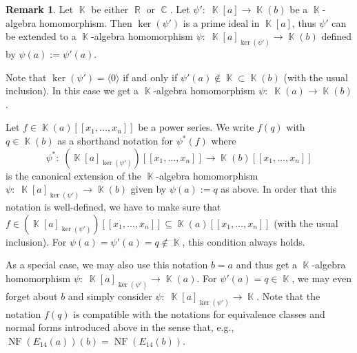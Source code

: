 \documentclass[noend]{amsproc}
\theoremstyle{definition}
\newtheorem{remark}[theorem]{Remark}
\newcommand{\NF}[1]{\operatorname{NF}(#1)}
\DeclareMathOperator{\R}{\mathbb{R}}
\DeclareMathOperator{\C}{\mathbb{C}}
\DeclareMathOperator{\K}{\mathbb{K}}
\begin{document}
\begin{remark}
Let $\K$ be either $\R$ or $\C$. Let $\psi':\; \K[a] \rightarrow \K(b)$ be a
$\K$-algebra homomorphism. Then $\ker(\psi')$ is a prime ideal in $\K[a]$, thus
$\psi'$ can be extended to a $\K$-algebra homomorphism
$\psi:\; \K[a]_{\ker(\psi')} \rightarrow \K(b)$ defined by
$\psi(a) := \psi'(a)$.

Note that $\ker(\psi') = \langle 0 \rangle$ if and only if
$\psi'(a) \not\in \K \subset \K(b)$ (with the usual inclusion). In this case we
get a $\K$-algebra homomorphism $\psi:\; \K(a) \rightarrow \K(b)$.

Let $f \in \K(a)[[x_1,\ldots,x_n]]$ be a power series. We write $f(q)$ with
$q \in \K(b)$ as a shorthand notation for $\psi^*(f)$ where
\[
\psi^*:\;
(\K[a]_{\ker(\psi')})[[x_1,\ldots,x_n]] \rightarrow \K(b)[[x_1,\ldots,x_n]]
\]
is the canonical extension of the $\K$-algebra homomorphism
$\psi:\; \K[a]_{\ker(\psi')} \rightarrow \K(b)$
given by $\psi(a) := q$ as above. In order that this notation is well-defined,
we have to make sure that
$f \in (\K[a]_{\ker(\psi')})[[x_1,\ldots,x_n]]
\subseteq \K(a)[[x_1,\ldots,x_n]]$
(with the usual inclusion). For $\psi(a) = \psi'(a) = q \not\in \K$, this
condition always holds.

As a special case, we may also use this notation $b = a$ and thus get a
$\K$-algebra homomorphism $\psi:\; \K[a]_{\ker(\psi')} \rightarrow \K(a)$.
For $\psi'(a) = q \in \K$, we may even forget about $b$ and simply consider
$\psi:\; \K[a]_{\ker(\psi')} \rightarrow \K$. Note
that the notation $f(q)$ is compatible with the notations for equivalence
classes and normal forms introduced above in the sense that, e.g.,
$\NF{E_{14}(a)}(b) = \NF{E_{14}(b)}$.
\end{remark}
\end{document}
